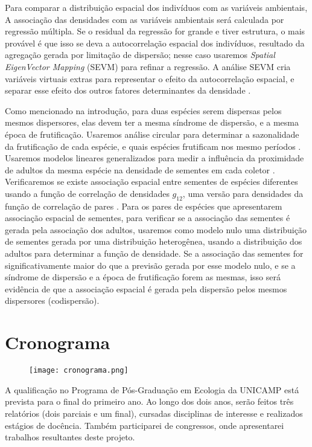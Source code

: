 \documentclass[twoside,12pt,a4paper]{report}
\begin{document}
Para comparar a distribuição espacial dos indivíduos com as variáveis ambientais, 
A associação das densidades com as variáveis ambientais será calculada por regressão
múltipla. Se o residual da regressão for grande e tiver estrutura, o mais provável é que isso
se deva a autocorrelação espacial dos indivíduos, resultado da agregação gerada por limitação
de dispersão; nesse caso usaremos {\em Spatial
EigenVector Mapping} (SEVM) para refinar a regressão. A análise SEVM cria variáveis virtuais
extras para representar o efeito da autocorrelação espacial, e separar esse efeito dos outros
fatores determinantes da densidade \citep{refsDiniz,Dormann2007methods}.

Como mencionado na introdução, para duas espécies
serem dispersas pelos mesmos dispersores, elas devem ter a mesma síndrome de dispersão, e a
mesma época de frutificação.
Usaremos análise circular para determinar a sazonalidade da frutificação de cada
espécie, e quais espécies frutificam nos mesmo períodos \citep{analisecircular}. 
Usaremos modelos lineares generalizados para medir a influência da proximidade de adultos da mesma
espécie na densidade de sementes em cada coletor \citep{Hardesty2002}. 
Verificaremos se existe associação espacial entre sementes de espécies diferentes usando a
função de correlação de densidades $g_{12}$, uma versão para densidades da função de
correlação de pares \citep{Fedriani2015}. 
Para os pares de espécies que apresentarem associação espacial de sementes, para verificar se
a associação das sementes é gerada pela associação dos adultos, usaremos
como modelo nulo uma distribuição de sementes gerada por uma distribuição heterogênea, usando
a distribuição dos adultos para determinar a função de densidade.
Se a associação das sementes for significativamente maior do que a previsão gerada por esse modelo nulo,
e se a síndrome de dispersão e a época de frutificação forem as mesmas, isso será evidência
de que a associação espacial é gerada pela dispersão pelos mesmos dispersores (codispersão).

\section{Cronograma}

	\begin{figure}[ht]
		\centering \texttt{[image: cronograma.png]}
    \end{figure}

A qualificação no Programa de Pós-Graduação em Ecologia da UNICAMP está prevista para o final do
primeiro ano. Ao longo dos dois anos, serão feitos três relatórios (dois parciais e um final),
cursadas disciplinas de interesse e realizados estágios de docência. Também participarei de
congressos, onde apresentarei trabalhos resultantes deste projeto.
\end{document}
